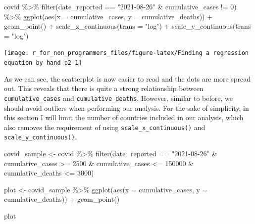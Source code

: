 \documentclass[
]{book}
\newenvironment{Shaded}{\begin{snugshade}}{\end{snugshade}}
\newcommand{\AttributeTok}[1]{\textcolor[rgb]{0.77,0.63,0.00}{#1}}
\newcommand{\DecValTok}[1]{\textcolor[rgb]{0.00,0.00,0.81}{#1}}
\newcommand{\FunctionTok}[1]{\textcolor[rgb]{0.00,0.00,0.00}{#1}}
\newcommand{\NormalTok}[1]{#1}
\newcommand{\OtherTok}[1]{\textcolor[rgb]{0.56,0.35,0.01}{#1}}
\newcommand{\SpecialCharTok}[1]{\textcolor[rgb]{0.00,0.00,0.00}{#1}}
\newcommand{\StringTok}[1]{\textcolor[rgb]{0.31,0.60,0.02}{#1}}
\begin{document}
\begin{Shaded}
\begin{Highlighting}[]
\NormalTok{covid }\SpecialCharTok{\%\textgreater{}\%}
  \FunctionTok{filter}\NormalTok{(date\_reported }\SpecialCharTok{==} \StringTok{"2021{-}08{-}26"} \SpecialCharTok{\&}
\NormalTok{           cumulative\_cases }\SpecialCharTok{!=} \DecValTok{0}\NormalTok{) }\SpecialCharTok{\%\textgreater{}\%}
  \FunctionTok{ggplot}\NormalTok{(}\FunctionTok{aes}\NormalTok{(}\AttributeTok{x =}\NormalTok{ cumulative\_cases,}
             \AttributeTok{y =}\NormalTok{ cumulative\_deaths)) }\SpecialCharTok{+}
  \FunctionTok{geom\_point}\NormalTok{() }\SpecialCharTok{+}
  \FunctionTok{scale\_x\_continuous}\NormalTok{(}\AttributeTok{trans =} \StringTok{"log"}\NormalTok{) }\SpecialCharTok{+}
  \FunctionTok{scale\_y\_continuous}\NormalTok{(}\AttributeTok{trans =} \StringTok{"log"}\NormalTok{)}
\end{Highlighting}
\end{Shaded}

\begin{center}\texttt{[image: r\_for\_non\_programmers\_files/figure-latex/Finding a regression equation by hand p2-1]} \end{center}

As we can see, the scatterplot is now easier to read and the dots are more spread out. This reveals that there is quite a strong relationship between \texttt{cumulative\_cases} and \texttt{cumulative\_deaths}. However, similar to before, we should avoid outliers when performing our analysis. For the sake of simplicity, in this section I will limit the number of countries included in our analysis, which also removes the requirement of using \texttt{scale\_x\_continuous()} and \texttt{scale\_y\_continuous()}.

\begin{Shaded}
\begin{Highlighting}[]
\NormalTok{covid\_sample }\OtherTok{\textless{}{-}}\NormalTok{ covid }\SpecialCharTok{\%\textgreater{}\%}
  \FunctionTok{filter}\NormalTok{(date\_reported }\SpecialCharTok{==} \StringTok{"2021{-}08{-}26"} \SpecialCharTok{\&}
\NormalTok{           cumulative\_cases }\SpecialCharTok{\textgreater{}=} \DecValTok{2500} \SpecialCharTok{\&}
\NormalTok{           cumulative\_cases }\SpecialCharTok{\textless{}=} \DecValTok{150000} \SpecialCharTok{\&}
\NormalTok{           cumulative\_deaths }\SpecialCharTok{\textless{}=} \DecValTok{3000}\NormalTok{)}

\NormalTok{plot }\OtherTok{\textless{}{-}}\NormalTok{ covid\_sample }\SpecialCharTok{\%\textgreater{}\%}
  \FunctionTok{ggplot}\NormalTok{(}\FunctionTok{aes}\NormalTok{(}\AttributeTok{x =}\NormalTok{ cumulative\_cases,}
             \AttributeTok{y =}\NormalTok{ cumulative\_deaths)) }\SpecialCharTok{+}
  \FunctionTok{geom\_point}\NormalTok{()}

\NormalTok{plot}
\end{Highlighting}
\end{Shaded}
\end{document}
